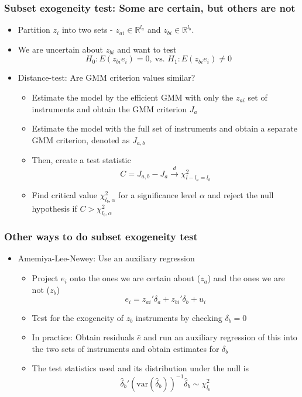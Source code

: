 \documentclass[aspectratio=169]{beamer}
\begin{document}
\begin{frame}
\frametitle{Subset exogeneity test: Some are certain, but others are not}
\begin{itemize}
\item Partition $z_i$ into two sets - $z_{ai}\in\mathbb{R}^{l_a}$ and $z_{bi}\in\mathbb{R}^{l_b}$. 
\item We are uncertain about $z_{bi}$ and want to test 
\[
H_0: E(z_{bi}e_i)=0, \ \text{vs. }H_1:E(z_{bi}e_i)\neq0
\]
\item Distance-test: Are GMM criterion values similar?
\begin{itemize}
\item  Estimate the model by the efficient GMM with only the $z_{ai}$ set of instruments and obtain the GMM criterion $J_a$
\item  Estimate the model with the full set of instruments and obtain a separate GMM criterion, denoted as $J_{a,b}$
\item Then, create a test statistic
\[
C=J_{a,b}-J_a\xrightarrow{d}\chi^2_{l-l_a=l_b}
\]
\item Find critical value $\chi_{l_b,\alpha}^2$ for a significance level $\alpha$ and reject the null hypothesis if $C>\chi_{l_b,\alpha}^2$
\end{itemize}
\end{itemize}
\end{frame}

\begin{frame}
\frametitle{Other ways to do subset exogeneity test}
\begin{itemize}
\item Amemiya-Lee-Newey: Use an auxiliary regression
\begin{itemize}
\item Project $e_i$ onto the ones we are certain about ($z_a$) and the ones we are not ($z_b$)
\[
e_i = z_{ai}'\delta_a+z_{bi}'\delta_b+u_i
\]
\item Test for the exogeneity of $z_b$ instruments by checking $\delta_b=0$
\item In practice: Obtain residuals $\hat{e}$ and run an auxiliary regression of this into the two sets of instruments and obtain estimates for $\delta_b$
\item  The test statistics used and its distribution under the null is
\[
\hat{\delta}_b'(\text{var}(\hat{\delta}_b))^{-1}\hat{\delta}_b \sim \chi_{l_b}^2
\] 
\end{itemize}
\end{itemize}
\end{frame}
\end{document}
